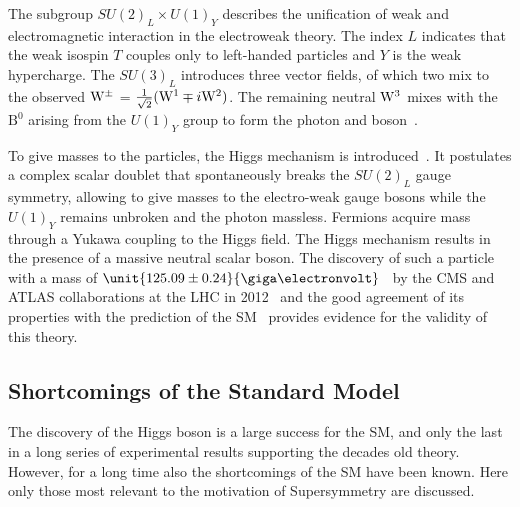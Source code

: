 The subgroup $SU(2)_L \times U(1)_Y$ describes the unification of weak and electromagnetic interaction in the electroweak theory. The index $L$ indicates that the weak isospin $T$ couples only to left-handed particles and $Y$ is the weak hypercharge. The $SU(3)_L$ introduces three vector fields, of which two mix to the observed $\mathrm{W}^{\pm}$ = $\frac{1}{\sqrt{2}}(\mathrm{W}^1\mp i\mathrm{W}^2)$. The remaining neutral $\mathrm{W}^3$ mixes with the $\mathrm{B}^0$ arising from the $U(1)_Y$ group to form the photon and \Z boson~\cite{HalzenMartin}.

To give masses to the particles, the Higgs mechanism is introduced~\cite{PhysRevLett.13.508,PhysRevLett.13.321,PhysRevLett.13.585}. It postulates a complex scalar doublet that spontaneously breaks the $SU(2)_L$ gauge symmetry, allowing to give masses to the electro-weak gauge bosons while the $U(1)_Y$ remains unbroken and the photon massless. Fermions acquire mass through a Yukawa coupling to the Higgs field. The Higgs mechanism results in the presence of a massive neutral scalar boson. The discovery of such a particle with a mass of $\unit{125.09\pm0.24}{\giga\electronvolt}$~\cite{Aad:2015zhl} by the CMS and ATLAS collaborations at the LHC in 2012~\cite{Chatrchyan:2012ufa,Aad:2012tfa} and the good agreement of its properties with the prediction of the SM~\cite{Khachatryan:2014jba} provides evidence for the validity of this theory.   

\subsection*{Shortcomings of the Standard Model}
The discovery of the Higgs boson is a large success for the SM, and only the last in a long series of experimental results supporting the decades old theory. However, for a long time also the shortcomings of the SM have been known. Here only those most relevant to the motivation of Supersymmetry are discussed.

